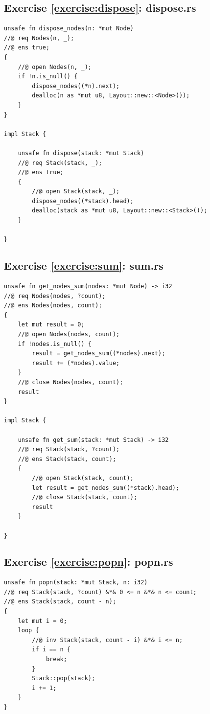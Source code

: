 \documentclass{article}
\begin{document}
\subsection{Exercise
\ref{exercise:dispose}: dispose.rs}\label{solution:dispose}

\begin{lstlisting}
unsafe fn dispose_nodes(n: *mut Node)
//@ req Nodes(n, _);
//@ ens true;
{
    //@ open Nodes(n, _);
    if !n.is_null() {
        dispose_nodes((*n).next);
        dealloc(n as *mut u8, Layout::new::<Node>());
    }
}

impl Stack {

    unsafe fn dispose(stack: *mut Stack)
    //@ req Stack(stack, _);
    //@ ens true;
    {
        //@ open Stack(stack, _);
        dispose_nodes((*stack).head);
        dealloc(stack as *mut u8, Layout::new::<Stack>());
    }

}
\end{lstlisting}

\subsection{Exercise
\ref{exercise:sum}: sum.rs}\label{solution:sum}

\begin{lstlisting}
unsafe fn get_nodes_sum(nodes: *mut Node) -> i32
//@ req Nodes(nodes, ?count);
//@ ens Nodes(nodes, count);
{
    let mut result = 0;
    //@ open Nodes(nodes, count);
    if !nodes.is_null() {
        result = get_nodes_sum((*nodes).next);
        result += (*nodes).value;
    }
    //@ close Nodes(nodes, count);
    result
}

impl Stack {

    unsafe fn get_sum(stack: *mut Stack) -> i32
    //@ req Stack(stack, ?count);
    //@ ens Stack(stack, count);
    {
        //@ open Stack(stack, count);
        let result = get_nodes_sum((*stack).head);
        //@ close Stack(stack, count);
        result
    }

}
\end{lstlisting}

\subsection{Exercise
\ref{exercise:popn}: popn.rs}\label{solution:popn}

\begin{lstlisting}
unsafe fn popn(stack: *mut Stack, n: i32)
//@ req Stack(stack, ?count) &*& 0 <= n &*& n <= count;
//@ ens Stack(stack, count - n);
{
    let mut i = 0;
    loop {
        //@ inv Stack(stack, count - i) &*& i <= n;
        if i == n {
            break;
        }
        Stack::pop(stack);
        i += 1;
    }
}
\end{lstlisting}
\end{document}
